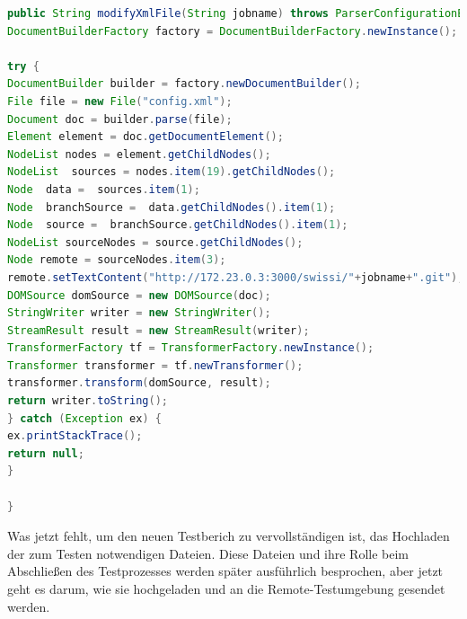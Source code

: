 \documentclass[a4paper,12pt,oneside]{book}
\begin{document}
\begin{lstlisting}[language=JAVA,caption=modifyXmlFil]
public String modifyXmlFile(String jobname) throws ParserConfigurationException, SAXException, IOException {
DocumentBuilderFactory factory = DocumentBuilderFactory.newInstance();

try {
DocumentBuilder builder = factory.newDocumentBuilder();
File file = new File("config.xml");
Document doc = builder.parse(file);
Element element = doc.getDocumentElement();
NodeList nodes = element.getChildNodes();
NodeList  sources = nodes.item(19).getChildNodes();
Node  data =  sources.item(1);
Node  branchSource =  data.getChildNodes().item(1);
Node  source =  branchSource.getChildNodes().item(1);
NodeList sourceNodes = source.getChildNodes();
Node remote = sourceNodes.item(3);
remote.setTextContent("http://172.23.0.3:3000/swissi/"+jobname+".git");
DOMSource domSource = new DOMSource(doc);
StringWriter writer = new StringWriter();
StreamResult result = new StreamResult(writer);
TransformerFactory tf = TransformerFactory.newInstance();
Transformer transformer = tf.newTransformer();
transformer.transform(domSource, result);
return writer.toString();    
} catch (Exception ex) {
ex.printStackTrace();
return null;
}

}
\end{lstlisting} 
Was jetzt fehlt, um den neuen Testberich zu vervollständigen ist, das Hochladen der zum Testen notwendigen Dateien. Diese Dateien und ihre Rolle beim Abschließen des Testprozesses werden später ausführlich besprochen, aber jetzt geht es darum, wie sie hochgeladen und an die Remote-Testumgebung gesendet werden.
\end{document}
